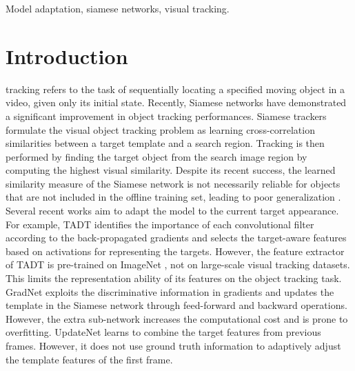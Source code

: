 \documentclass[journal]{IEEEtran}
\begin{document}
\begin{IEEEkeywords}
Model adaptation, siamese networks, visual tracking.
\end{IEEEkeywords}

\IEEEpeerreviewmaketitle

\section{Introduction}
 tracking refers to the task of sequentially locating a specified moving object in a video, given only its initial state. Recently, Siamese networks \cite{danelljan2019atom, bertinetto2016fully} have demonstrated a significant improvement in object tracking performances. Siamese trackers formulate the visual object tracking problem as learning cross-correlation similarities between a target template and a search region. Tracking is then performed by finding the target object from the search image region by computing the highest visual similarity. Despite its recent success, the learned similarity measure of the Siamese network is not necessarily reliable for objects that are not included in the offline training set, leading to poor generalization \cite{Bhat_2019_ICCV}. Several recent works aim to adapt the model to the current target appearance. For example, TADT \cite{Li_2019_CVPR} identifies the importance of each convolutional filter according to the back-propagated gradients and selects the target-aware features based on activations for representing the targets. However, the feature extractor of TADT is pre-trained on ImageNet \cite{russakovsky2015imagenet}, not on large-scale visual tracking datasets. This limits the representation ability of its features on the object tracking task. GradNet \cite{Li_2019_ICCV} exploits the discriminative information in gradients and updates the template in the Siamese network through feed-forward and backward operations. However, the extra sub-network increases the computational cost and is prone to overfitting. UpdateNet \cite{Zhang_2019_ICCV} learns to combine the target features from previous frames. However, it does not use ground truth information to adaptively adjust the template features of the first frame.
\end{document}

